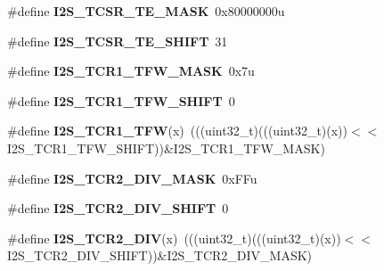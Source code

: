 \begin{DoxyCompactItemize}
\item 
\#define {\bfseries I2\+S\+\_\+\+T\+C\+S\+R\+\_\+\+T\+E\+\_\+\+M\+A\+SK}~0x80000000u\hypertarget{group__I2S__Register__Masks_ga38911a5988cffd69ad0817c00522518c}{}\label{group__I2S__Register__Masks_ga38911a5988cffd69ad0817c00522518c}

\item 
\#define {\bfseries I2\+S\+\_\+\+T\+C\+S\+R\+\_\+\+T\+E\+\_\+\+S\+H\+I\+FT}~31\hypertarget{group__I2S__Register__Masks_gab02a94b13756ac9869d4125313c7d651}{}\label{group__I2S__Register__Masks_gab02a94b13756ac9869d4125313c7d651}

\item 
\#define {\bfseries I2\+S\+\_\+\+T\+C\+R1\+\_\+\+T\+F\+W\+\_\+\+M\+A\+SK}~0x7u\hypertarget{group__I2S__Register__Masks_ga26d9f7626514208432dc7850225cc752}{}\label{group__I2S__Register__Masks_ga26d9f7626514208432dc7850225cc752}

\item 
\#define {\bfseries I2\+S\+\_\+\+T\+C\+R1\+\_\+\+T\+F\+W\+\_\+\+S\+H\+I\+FT}~0\hypertarget{group__I2S__Register__Masks_ga2a0a40da6ee3bcfa9f8088dcfbb676c7}{}\label{group__I2S__Register__Masks_ga2a0a40da6ee3bcfa9f8088dcfbb676c7}

\item 
\#define {\bfseries I2\+S\+\_\+\+T\+C\+R1\+\_\+\+T\+FW}(x)~(((uint32\+\_\+t)(((uint32\+\_\+t)(x))$<$$<$I2\+S\+\_\+\+T\+C\+R1\+\_\+\+T\+F\+W\+\_\+\+S\+H\+I\+FT))\&I2\+S\+\_\+\+T\+C\+R1\+\_\+\+T\+F\+W\+\_\+\+M\+A\+SK)\hypertarget{group__I2S__Register__Masks_gad9addcfc5012395e9d579bdf7091dddc}{}\label{group__I2S__Register__Masks_gad9addcfc5012395e9d579bdf7091dddc}

\item 
\#define {\bfseries I2\+S\+\_\+\+T\+C\+R2\+\_\+\+D\+I\+V\+\_\+\+M\+A\+SK}~0x\+F\+Fu\hypertarget{group__I2S__Register__Masks_ga9bbd597b1d3a839f74d15c3b6c309bb7}{}\label{group__I2S__Register__Masks_ga9bbd597b1d3a839f74d15c3b6c309bb7}

\item 
\#define {\bfseries I2\+S\+\_\+\+T\+C\+R2\+\_\+\+D\+I\+V\+\_\+\+S\+H\+I\+FT}~0\hypertarget{group__I2S__Register__Masks_gad553f8b1c1cc03ded483d997640b410a}{}\label{group__I2S__Register__Masks_gad553f8b1c1cc03ded483d997640b410a}

\item 
\#define {\bfseries I2\+S\+\_\+\+T\+C\+R2\+\_\+\+D\+IV}(x)~(((uint32\+\_\+t)(((uint32\+\_\+t)(x))$<$$<$I2\+S\+\_\+\+T\+C\+R2\+\_\+\+D\+I\+V\+\_\+\+S\+H\+I\+FT))\&I2\+S\+\_\+\+T\+C\+R2\+\_\+\+D\+I\+V\+\_\+\+M\+A\+SK)\hypertarget{group__I2S__Register__Masks_ga89a576437056ff39e6a6e0474cbd8371}{}\label{group__I2S__Register__Masks_ga89a576437056ff39e6a6e0474cbd8371}


\end{DoxyCompactItemize}
